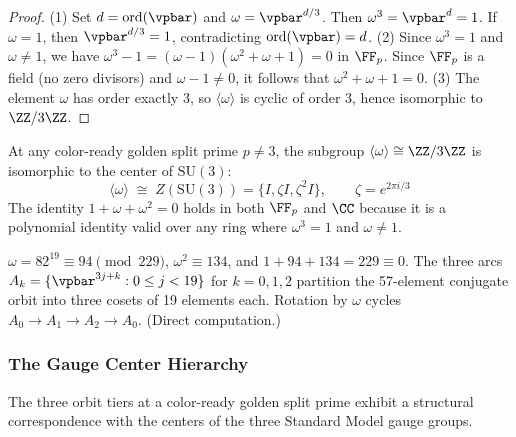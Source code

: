 \begin{proof}
(1) Set $d = \mathrm{ord}(\vpbar)$ and $\omega = \vpbar^{d/3}$. Then $\omega^3 = \vpbar^d = 1$. If $\omega = 1$, then $\vpbar^{d/3} = 1$, contradicting $\mathrm{ord}(\vpbar) = d$. (2) Since $\omega^3 = 1$ and $\omega \neq 1$, we have $\omega^3 - 1 = (\omega - 1)(\omega^2 + \omega + 1) = 0$ in $\FF_p$. Since $\FF_p$ is a field (no zero divisors) and $\omega - 1 \neq 0$, it follows that $\omega^2 + \omega + 1 = 0$. (3) The element $\omega$ has order exactly 3, so $\langle\omega\rangle$ is cyclic of order 3, hence isomorphic to $\ZZ/3\ZZ$. \qedhere
\end{proof}

\begin{theorem}\label{thm:center}
At any color-ready golden split prime $p \neq 3$, the subgroup $\langle\omega\rangle \cong \ZZ/3\ZZ$ is isomorphic to the center of $\mathrm{SU}(3)$:
$$\langle\omega\rangle \;\cong\; Z(\mathrm{SU}(3)) = \{I, \zeta I, \zeta^2 I\}, \qquad \zeta = e^{2\pi i/3}$$
The identity $1 + \omega + \omega^2 = 0$ holds in both $\FF_p$ and $\CC$ because it is a polynomial identity valid over any ring where $\omega^3 = 1$ and $\omega \neq 1$.
\end{theorem}

\begin{remark}[Instantiation at $p = 229$]
$\omega = 82^{19} \equiv 94 \pmod{229}$, $\omega^2 \equiv 134$, and $1 + 94 + 134 = 229 \equiv 0$. The three arcs $A_k = \{\vpbar^{3j+k} : 0 \leq j < 19\}$ for $k = 0, 1, 2$ partition the 57-element conjugate orbit into three cosets of 19 elements each. Rotation by $\omega$ cycles $A_0 \to A_1 \to A_2 \to A_0$. (Direct computation.)
\end{remark}

\subsubsection*{The Gauge Center Hierarchy}

The three orbit tiers at a color-ready golden split prime exhibit a structural correspondence with the centers of the three Standard Model gauge groups.

